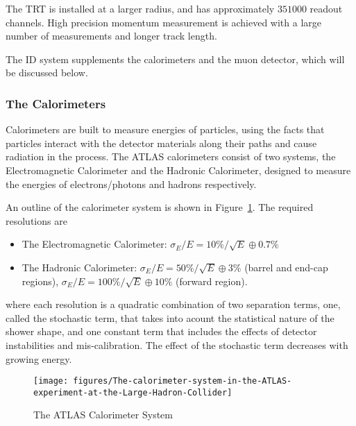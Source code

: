 The TRT is installed at a larger radius, and has approximately $351000$ readout
channels. High precision momentum measurement is achieved with a large number
of measurements and longer track length.

\vspace{5mm}


The ID system supplements the calorimeters and the muon detector, which will be
discussed below.

\subsubsection{The Calorimeters}

Calorimeters are built to measure energies of particles, using the facts that
particles interact with the detector materials along their paths and cause
radiation in the process. The ATLAS calorimeters \cite{lhcaccexp, atlasdreport}
consist of two systems, the Electromagnetic Calorimeter and the Hadronic
Calorimeter, designed to measure the energies of electrons/photons and hadrons
respectively.

An outline of the calorimeter system is shown in Figure~\ref{f:emc}. The
required resolutions are

\begin{itemize}

	\item The Electromagnetic Calorimeter: $\sigma_E / E = 10\% /\sqrt{E} \oplus
		      0.7\%$

	\item The Hadronic Calorimeter: $\sigma_E / E = 50\% /\sqrt{E} \oplus 3\%$
	      (barrel and end-cap regions), $\sigma_E / E = 100\% /\sqrt{E} \oplus 10\%$
	      (forward region).

\end{itemize}

where each resolution is a quadratic combination of two separation terms, one,
called the stochastic term, that takes into acount the statistical nature of
the shower shape, and one constant term that includes the effects of detector
instabilities and mis-calibration. The effect of the stochastic term decreases
with growing energy.

\begin{figure}[H]
	\texttt{[image: figures/The-calorimeter-system-in-the-ATLAS-experiment-at-the-Large-Hadron-Collider]}
	\centering
	\caption{The ATLAS Calorimeter System}\cite{atlasdetector}
	\label{f:emc}
\end{figure}

